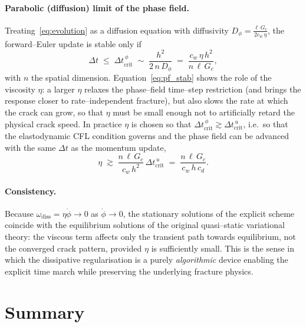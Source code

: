 \documentclass[12pt,a4paper]{article}
\newcommand{\Dt}{\Delta t}
\begin{document}
	\paragraph{Parabolic (diffusion) limit of the phase field.}
	Treating~\eqref{eq:evolution} as a diffusion equation with diffusivity
	$D_\phi=\tfrac{\ell\,G_c}{2c_w\,\eta}$, the forward--Euler update is stable only
	if
	\begin{equation}\label{eq:pf_stab}
		\Dt \;\le\; \Dt_{\mathrm{crit}}^{\,\phi} \;\sim\; \frac{h^2}{2\,n\,D_\phi}
		\;=\; \frac{c_w\,\eta\,h^2}{n\,\ell\,G_c},
	\end{equation}
	with $n$ the spatial dimension. Equation~\eqref{eq:pf_stab} shows the role of
	the viscosity $\eta$: a larger $\eta$ relaxes the phase--field time--step
	restriction (and brings the response closer to rate--independent fracture), but
	also slows the rate at which the crack can grow, so that $\eta$ must be small
	enough not to artificially retard the physical crack speed. In practice $\eta$
	is chosen so that $\Dt_{\mathrm{crit}}^{\,\phi}\gtrsim\Dt_{\mathrm{crit}}^{\,u}$,
	i.e.\ so that the elastodynamic CFL condition governs and the phase field can be
	advanced with the same $\Dt$ as the momentum update,
	\begin{equation}\label{eq:eta_choice}
		\eta \;\gtrsim\; \frac{n\,\ell\,G_c}{c_w\,h^2}\,\Dt_{\mathrm{crit}}^{\,u}
		\;=\; \frac{n\,\ell\,G_c}{c_w\,h\,c_d}.
	\end{equation}

	\paragraph{Consistency.}
	Because $\omega_{\mathrm{diss}}=\eta\dot\phi\to 0$ as $\dot\phi\to 0$, the
	stationary solutions of the explicit scheme coincide with the equilibrium
	solutions of the original quasi--static variational theory: the viscous term
	affects only the transient path towards equilibrium, not the converged
	crack pattern, provided $\eta$ is sufficiently small. This is the sense in which
	the dissipative regularisation is a purely \emph{algorithmic} device enabling
	the explicit time march while preserving the underlying fracture physics.

	\section{Summary}
\end{document}
